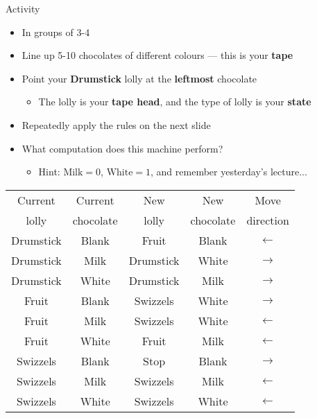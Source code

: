 \newcommand{\stateA}{Drumstick}
\newcommand{\stateB}{Fruit}
\newcommand{\stateC}{Swizzels}
\newcommand{\tapeX}{Blank}
\newcommand{\tapeO}{Milk}
\newcommand{\tapeI}{White}

\begin{frame}{Activity}
    \begin{itemize}
        \pause\item In groups of 3-4
        \pause\item Line up 5-10 chocolates of different colours --- this is your \textbf{tape}
        \pause\item Point your \textbf{\stateA} lolly at the \textbf{leftmost} chocolate
            \begin{itemize}
                \pause\item The lolly is your \textbf{tape head}, and the type of lolly is your \textbf{state}
            \end{itemize}
        \pause\item Repeatedly apply the rules on the next slide
        \pause\item What computation does this machine perform?
            \begin{itemize}
                \pause\item Hint: $\text{\tapeO}=0$, $\text{\tapeI}=1$, and remember yesterday's lecture...
            \end{itemize}
    \end{itemize}
\end{frame}

\begin{frame}
    \begin{tabular}{|cc|ccc|} \hline
        Current & Current & New & New & Move \\
        lolly & chocolate & lolly & chocolate & direction \\\hline
        \stateA & \tapeX & \stateB & \tapeX & $\leftarrow$  \\
        \stateA & \tapeO & \stateA & \tapeI & $\rightarrow$ \\
        \stateA & \tapeI & \stateA & \tapeO & $\rightarrow$ \\\hline
        \stateB & \tapeX & \stateC & \tapeI & $\rightarrow$ \\
        \stateB & \tapeO & \stateC & \tapeI & $\leftarrow$  \\
        \stateB & \tapeI & \stateB & \tapeO & $\leftarrow$  \\\hline
        \stateC & \tapeX & Stop    & \tapeX & $\rightarrow$ \\
        \stateC & \tapeO & \stateC & \tapeO & $\leftarrow$  \\
        \stateC & \tapeI & \stateC & \tapeI & $\leftarrow$  \\\hline
    \end{tabular}
\end{frame}

